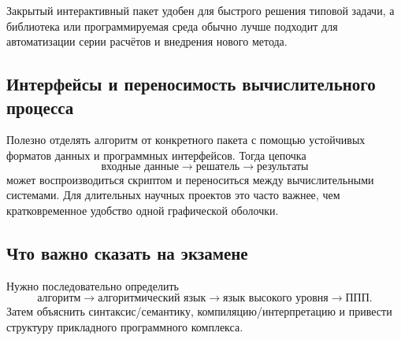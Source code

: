 Закрытый интерактивный пакет удобен для быстрого решения типовой задачи, а
библиотека или программируемая среда обычно лучше подходит для автоматизации
серии расчётов и внедрения нового метода.

\subsection{Интерфейсы и переносимость вычислительного процесса}

Полезно отделять алгоритм от конкретного пакета с помощью устойчивых форматов
данных и программных интерфейсов. Тогда цепочка
\[
\text{входные данные}\to\text{решатель}\to\text{результаты}
\]
может воспроизводиться скриптом и переноситься между вычислительными системами.
Для длительных научных проектов это часто важнее, чем кратковременное удобство
одной графической оболочки.


\subsection{Что важно сказать на экзамене}

Нужно последовательно определить
\[
\boxed{\text{алгоритм}\rightarrow\text{алгоритмический язык}\rightarrow\text{язык высокого уровня}\rightarrow\text{ППП}}.
\]
Затем объяснить синтаксис/семантику, компиляцию/интерпретацию и привести структуру прикладного программного комплекса.

\newpage
